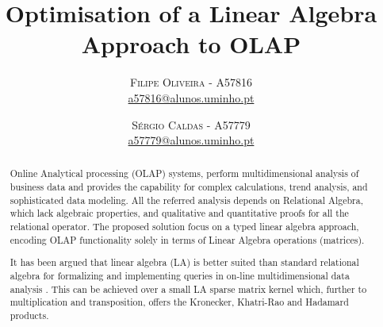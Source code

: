 \documentclass[twoside]{article}
\title{\vspace{-15mm}\fontsize{24pt}{10pt}\selectfont\textbf{Optimisation of a Linear Algebra Approach to OLAP}} %
\author{
\large
\textsc{Filipe Oliveira} - \textsc{A57816}\\
\normalsize \href{mailto:a57816@alunos.uminho.pt}{a57816@alunos.uminho.pt}
\vspace{-5mm}
\and
\textsc{Sérgio Caldas} - \textsc{A57779}\\
\normalsize \href{mailto:a57779@alunos.uminho.pt}{a57779@alunos.uminho.pt}
}
\begin{document}
\maketitle %

\thispagestyle{fancy} %


\begin{abstract}
\indent %
\par Online Analytical processing (OLAP) systems, perform multidimensional analysis of business data and provides the capability for complex calculations, trend analysis, and sophisticated data modeling. 
All the referred analysis depends on Relational Algebra, which lack algebraic properties, and qualitative and quantitative proofs for all the relational operator.
The proposed solution focus on a typed linear algebra approach, encoding OLAP functionality solely in terms of Linear Algebra operations (matrices).
\par It has been argued that linear algebra (LA) is better suited than standard relational algebra for formalizing and implementing queries in on-line multidimensional data analysis \cite{macedo2015linear} \cite{da2015benchmarking}. This can be achieved over a small LA sparse matrix kernel which, further to multiplication and transposition, offers the Kronecker, Khatri-Rao and Hadamard products.

\end{abstract}
\vspace{0.5cm}

\begin{multicols}{2} %


















\end{multicols}
\end{document}
